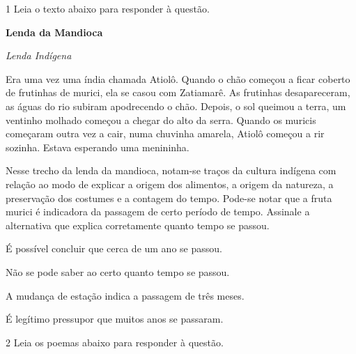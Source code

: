 \num{1} Leia o texto abaixo para responder à questão.

\begin{myquote}

\textbf{Lenda da Mandioca}

\emph{Lenda Indígena}

Era uma vez uma índia chamada Atiolô. Quando o chão começou a ficar
coberto de frutinhas de murici, ela se casou com Zatiamarê. As frutinhas
desapareceram, as águas do rio subiram apodrecendo o chão. Depois, o sol
queimou a terra, um ventinho molhado começou a chegar do alto da serra.
Quando os muricis começaram outra vez a cair, numa chuvinha amarela,
Atiolô começou a rir sozinha. Estava esperando uma menininha.


\end{myquote}

Nesse trecho da lenda da mandioca, notam-se traços da cultura
indígena com relação ao modo de explicar a origem dos alimentos, a
origem da natureza, a preservação dos costumes e a contagem do tempo.
Pode-se notar que a fruta murici é indicadora da passagem de certo 
período de tempo. Assinale a alternativa que explica corretamente 
quanto tempo se passou.

\begin{escolha}

  \item É possível concluir que cerca de um ano se passou.
  
  \item Não se pode saber ao certo quanto tempo se passou.
  
  \item A mudança de estação indica a passagem de três meses.  
  
  \item É legítimo pressupor que muitos anos se passaram. 

\end{escolha}

\num{2} Leia os poemas abaixo para responder à questão. 


